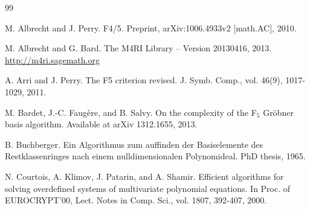 \documentclass[final, number, 3p,12pt]{elsarticle}
\begin{document}
\begin{thebibliography}{99}



M. Albrecht and J. Perry. F4/5. Preprint, arXiv:1006.4933v2 [math.AC], 2010.

M. Albrecht and G. Bard. The M4RI Library -- Version 20130416, 2013. \url{http://m4ri.sagemath.org}

A. Arri and J. Perry. The F5 criterion revised. J. Symb. Comp., vol. 46(9), 1017-1029, 2011.

M. Bardet, J.-C. Faug\`ere, and B. Salvy. On the complexity of the F$_5$ Gr\"obner basis algorithm. Available at arXiv 1312.1655, 2013.



B. Buchberger. Ein Algorithmus zum auffinden der Basiselemente des Restklassenringes nach einem nulldimensionalen Polynomideal. PhD thesis, 1965.





N. Courtois, A. Klimov, J. Patarin, and A. Shamir. Efficient algorithms for solving overdefined systems of multivariate polynomial equations. In Proc. of EUROCRYPT'00, Lect. Notes in Comp. Sci., vol. 1807, 392-407, 2000.


\end{thebibliography}
\end{document}
